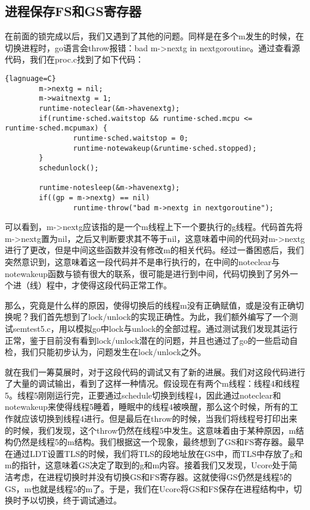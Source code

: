 \documentclass{article}
\begin{document}
\subsection{进程保存FS和GS寄存器}
在前面的锁完成以后，我们又遇到了其他的问题。同样是在多个m发生的时候，在切换进程时，go语言会throw报错：bad m->nextg in nextgoroutine。通过查看源代码，我们在proc.c找到了如下代码：
\begin{lstlisting}{lagnuage=C}
        m->nextg = nil;
        m->waitnextg = 1;
        runtime·noteclear(&m->havenextg);
        if(runtime·sched.waitstop && runtime·sched.mcpu <= runtime·sched.mcpumax) {
                runtime·sched.waitstop = 0;
                runtime·notewakeup(&runtime·sched.stopped);
        }
        schedunlock();

        runtime·notesleep(&m->havenextg);
        if((gp = m->nextg) == nil)
                runtime·throw("bad m->nextg in nextgoroutine");
\end{lstlisting}
可以看到，m->nextg应该指的是一个m线程上下一个要执行的g线程。代码首先将m->nextg置为nil，之后又判断要求其不等于nil，这意味着中间的代码对m->nextg进行了更改，但是中间这些函数并没有修改m的相关代码。经过一番困惑后，我们突然意识到，这意味着这一段代码并不是串行执行的，在中间的noteclear与notewakeup函数与锁有很大的联系，很可能是进行到中间，代码切换到了另外一个进（线）程中，才使得这段代码正常工作。

那么，究竟是什么样的原因，使得切换后的线程m没有正确赋值，或是没有正确切换呢？我们首先想到了lock/unlock的实现正确性。为此，我们额外编写了一个测试semtest5.c，用以模拟go中lock与unlock的全部过程。通过测试我们发现其运行正常，鉴于目前没有看到lock/unlock潜在的问题，并且也通过了go的一些启动自检，我们只能初步认为，问题发生在lock/unlock之外。

就在我们一筹莫展时，对于这段代码的调试又有了新的进展。我们对这段代码进行了大量的调试输出，看到了这样一种情况。假设现在有两个m线程：线程4和线程5。线程5刚刚运行完，正要通过schedule切换到线程4，因此通过noteclear和notewakeup来使得线程5睡着，睡眠中的线程4被唤醒，那么这个时候，所有的工作就应该切换到线程4进行。但是最后在throw的时候，当我们将线程号打印出来的时候，我们发现，这个throw仍然在线程5中发生。这意味着由于某种原因，m结构仍然是线程5的m结构。我们根据这一个现象，最终想到了GS和FS寄存器。最早在通过LDT设置TLS的时候，我们将TLS的段地址放在GS中，而TLS中存放了g和m的指针，这意味着GS决定了取到的g和m内容。接着我们又发现，Ucore处于简洁考虑，在进程切换时并没有切换GS和FS寄存器。这就使得GS仍然是线程5的GS，m也就是线程5的m了。于是，我们在Ucore将GS和FS保存在进程结构中，切换时予以切换，终于调试通过。
\end{document}
